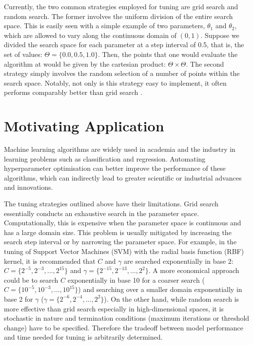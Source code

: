 \documentclass[letterpaper]{article}
\begin{document}
Currently, the two common strategies employed for tuning are grid search and
random search. The former involves the uniform division of the entire search
space. This is easily seen with a simple example of two parameters, $\theta_1$ and
$\theta_2$, which are allowed to vary along the continuous domain of $(0, 1)$.
Suppose we divided the search space for each parameter at a step interval of 0.5,
that is, the set of values: $\Theta=\{0.0, 0.5, 1.0\}$. Then, the points that one
would evaluate the algorithm at would be given by the cartesian product: $\Theta \times \Theta$.
The second strategy simply involves the random selection of a number of points
within the search space. Notably, not only is this strategy easy to implement, it
often performs comparably better than grid search \cite{bergstra2012random}.

\section{Motivating Application}
Machine learning algorithms are widely used in academia and the industry in learning
problems such as classification and regression. Automating hyperparameter optimisation
can better improve the performance of these algorithms, which can indirectly lead
to greater scientific or industrial advances and innovations.

The tuning strategies outlined above have their limitations. Grid search essentially
conducts an exhaustive search in the parameter space. Computationally, this is expensive
when the parameter space is continuous and has a large domain size. This problem
is usually mitigated by increasing the search step interval
or by narrowing the parameter space. For example, in the tuning of Support Vector Machines
(SVM) with the radial basis function (RBF) kernel, it is recommended that $\textit{C}$ and $\gamma$ are searched
exponentially in base 2: $\textit{C}=\{2^{-5},2^{-3},...,2^{15}\}$ \cite{hsu2016practical} and
$\gamma=\{2^{-15},2^{-13},...,2^{2}\}$. A more economical approach could be to search
$\textit{C}$ exponentially in base 10 for a coarser search
($\textit{C}=\{10^{-5},10^{-3},...,10^{15}\}$) and searching over a smaller domain
exponentially in base 2 for $\gamma$ ($\gamma=\{2^{-6},2^{-4},...,2^{2}\}$). On the other hand, while random
search is more effective than grid search especially in high-dimensional spaces,
it is stochastic in nature and termination conditions (maximum iterations or threshold change)
have to be specified. Therefore the tradeoff between model performance and time needed
for tuning is arbitrarily determined.
\end{document}
